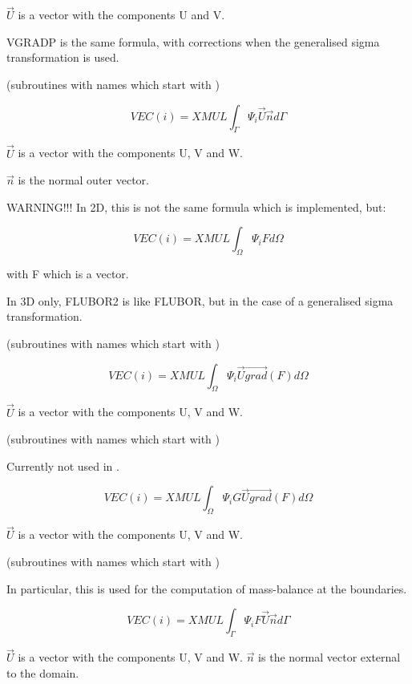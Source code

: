 $\vec{U}$ is a vector with the components U and V.

VGRADP is the same formula, with corrections when the generalised sigma
transformation is used.


(subroutines with names which start with )

\[VEC(i)=XMUL \int _{\Gamma } \Psi _{i}   \vec{U} \vec{n} d\Gamma  \]

$\vec{U}$ is a vector with the components U, V and W.

$\vec{n}$ is the normal outer vector.

WARNING!!! In 2D, this is not the same formula which is implemented, but:

\[VEC(i)=XMUL \int _{\Omega } \Psi _{i} F d\Omega  \]

with F which is a vector.


In 3D only, FLUBOR2 is like FLUBOR, but in the case of a generalised sigma transformation.


(subroutines with names which start with )

\[VEC(i)=XMUL \int _{\Omega }\Psi _{i}  \vec{U} \overrightarrow{grad} ( F )  d\Omega  \]

$\vec{U}$ is a vector with the components U, V and W.


(subroutines with names which start with )

Currently not used in \tel.

\[VEC(i)=XMUL \int _{\Omega }\Psi _{i}  G \vec{U} \overrightarrow{grad} ( F )  d\Omega  \]

$\vec{U}$ is a vector with the components U, V and W.


(subroutines with names which start with )

In particular, this is used for the computation of mass-balance at the
boundaries.

\[VEC(i)=XMUL \int _{\Gamma } \Psi _{i}   F \vec{U} \vec{n} d\Gamma  \]

$\vec{U}$ is a vector with the components U, V and W.
$\vec{n}$ is the normal vector external to the domain.

